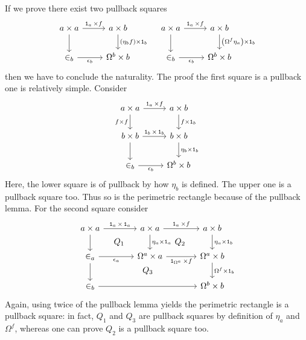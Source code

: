 If we prove there exist two pullback squares
\[\begin{tikzcd}
a \times a \ar[d] \ar["{\id_a \times f}", r] & a \times b \ar["{(\eta_b f) \times \id_b}", d] \\
\in_b \ar["{\epsilon_b}", r, swap] & \Omega^b \times b
\end{tikzcd} \quad \begin{tikzcd}
a \times a \ar[d] \ar["{\id_a \times f}", r] & a \times b \ar["{\left(\Omega^f \eta_a \right) \times \id_b}", d] \\
\in_b \ar["{\epsilon_b}", r, swap] & \Omega^b \times b
\end{tikzcd}\]
then we have to conclude the naturality. The proof the first square is a pullback one is relatively simple. Consider
\[\begin{tikzcd}
a \times a \ar["{f \times f}", d, swap] \ar["{\id_a \times f}", r] & a \times b \ar["{f \times \id_b}", d] \\
b \times b \ar[d] \ar["{\id_b \times \id_b}", r] & b \times b \ar["{\eta_b \times \id_b}", d] \\
\in_b \ar["{\epsilon_b}", r, swap] & \Omega^b \times b
\end{tikzcd}\]
Here, the lower square is of pullback by how \(\eta_b\) is defined. The upper one is a pullback square too.  Thus so is the perimetric rectangle because of the pullback lemma. For the second square consider
\[\begin{tikzcd}[column sep=large]
a \times a \ar[d] \ar["{\id_a \times \id_a}", r] \ar["{Q_1}", dr, phantom] & a \times a \ar["{\eta_a \times \id_a}", d] \ar["{\id_a \times f}", r] \ar["{Q_2}", dr, phantom] & a \times b \ar["{\eta_a \times \id_b}", d] \\
\in_a \ar[d] \ar["{\epsilon_a}", r, swap] \ar["{Q_3}", drr, phantom] & \Omega^a \times a \ar["\id_{\Omega^a} \times f", r, swap] & \Omega^a \times b \ar["{\Omega^f \times \id_b}", d] \\
\in_b \ar[rr] & & \Omega^b \times b
\end{tikzcd}\]
Again, using twice of the pullback lemma yields the perimetric rectangle is a pullback square: in fact, \(Q_1\) and \(Q_3\) are pullback squares by definition of \(\eta_a\) and \(\Omega^f\), whereas one can prove \(Q_2\) is a pullback square too. 